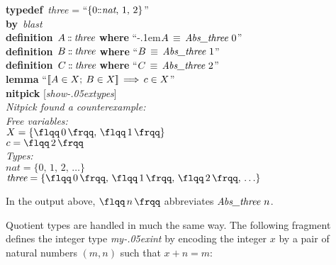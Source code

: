 \documentclass[a4paper,12pt]{article}
\def\Colon{\mathord{:\mkern-1.5mu:}}
\def\unr{\ldots}
\def\Abs#1{\hbox{\rm{\flqq}}{\,#1\,}\hbox{\rm{\frqq}}}
\renewcommand\_{\hbox{\textunderscore\kern-.05ex}}
\begin{document}
\prew
\textbf{typedef}~\textit{three} = ``$\{0\Colon\textit{nat},\, 1,\, 2\}$'' \\
\textbf{by}~\textit{blast} \\[2\smallskipamount]
\textbf{definition}~$A \mathbin{\Colon} \textit{three}$ \textbf{where} ``\kern-.1em$A \,\equiv\, \textit{Abs\_\allowbreak three}~0$'' \\
\textbf{definition}~$B \mathbin{\Colon} \textit{three}$ \textbf{where} ``$B \,\equiv\, \textit{Abs\_three}~1$'' \\
\textbf{definition}~$C \mathbin{\Colon} \textit{three}$ \textbf{where} ``$C \,\equiv\, \textit{Abs\_three}~2$'' \\[2\smallskipamount]
\textbf{lemma} ``$\mathopen{[\![} A \in X;\> B \in X\mathclose{]\!]} \,\Longrightarrow\, c \in X$'' \\
\textbf{nitpick} [\textit{show\_types}] \\[2\smallskipamount]
\slshape Nitpick found a counterexample: \\[2\smallskipamount]
\hbox{}\qquad Free variables: \nopagebreak \\
\hbox{}\qquad\qquad $X = \{\Abs{0},\, \Abs{1}\}$ \\
\hbox{}\qquad\qquad $c = \Abs{2}$ \\
\hbox{}\qquad Types: \\
\hbox{}\qquad\qquad $\textit{nat} = \{0,\, 1,\, 2,\, \unr\}$ \\
\hbox{}\qquad\qquad $\textit{three} = \{\Abs{0},\, \Abs{1},\, \Abs{2},\, \unr\}$
\postw

In the output above, $\Abs{n}$ abbreviates $\textit{Abs\_three}~n$.

Quotient types are handled in much the same way. The following fragment defines
the integer type \textit{my\_int} by encoding the integer $x$ by a pair of
natural numbers $(m, n)$ such that $x + n = m$:
\end{document}
